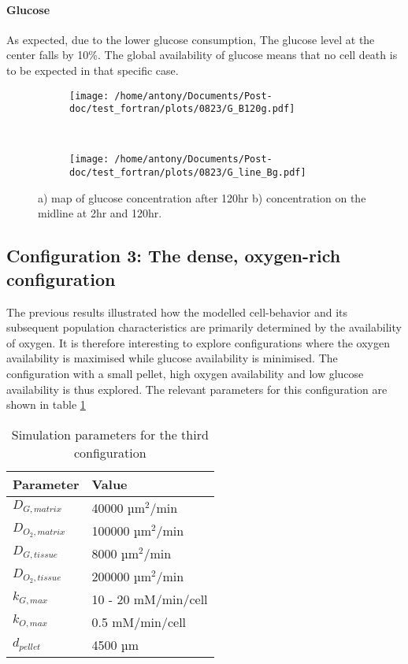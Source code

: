 \documentclass[11pt,a4paper]{article}
\begin{document}
\paragraph{Glucose}
As expected, due to the lower glucose consumption, The glucose level at the center falls by 10\%. The global availability of glucose means that no cell death is to be expected in that specific case.\\

\begin{figure}[ht!]
	\begin{subfigure}{0.5\textwidth}
	\centering
	\texttt{[image: /home/antony/Documents/Post-doc/test\_fortran/plots/0823/G\_B120g.pdf]}
	\caption{ \label{G_B120}}
	\end{subfigure}
	~~
	\begin{subfigure}{0.4\textwidth}
	\texttt{[image: /home/antony/Documents/Post-doc/test\_fortran/plots/0823/G\_line\_Bg.pdf]}
		\caption{ \label{G_line_B}}
	\end{subfigure}
	\caption{a) map of glucose concentration after 120hr b) concentration on the midline at 2hr and 120hr.\label{G_B}}
	\end{figure}
	

\subsection{Configuration 3: The dense, oxygen-rich configuration}
The previous results illustrated how the modelled cell-behavior and its subsequent population characteristics are primarily determined by the availability of oxygen. It is therefore interesting to explore configurations where the oxygen availability is maximised while glucose availability is minimised. The configuration with a small pellet, high oxygen availability and low glucose availability is thus explored. The relevant parameters for this configuration are shown in table \ref{params3}

\begin{table}[h!]
\begin{center}
\begin{tabular}{ |p{20mm}|p{45mm}| }
\hline 
\textbf{Parameter} & \textbf{Value}\\
\hline
\hline
$D_{G,matrix}$ & 40000 µm$^2$/min \\
\hline
$D_{O_2,matrix}$ & 100000 µm$^2$/min \\
\hline
$D_{G,tissue}$ & 8000 µm$^2$/min \\
\hline
$D_{O_2,tissue}$ & 200000 µm$^2$/min \\
\hline
$k_{G,max}$ & 10 - 20 mM/min/cell \\
\hline
$k_{O,max}$ & 0.5 mM/min/cell \\
\hline
$d_{pellet}$ & 4500 µm\\
\hline
\end{tabular}
\caption{Simulation parameters for the third configuration \label{params3}}   
\end{center}
\end{table} 
\end{document}
